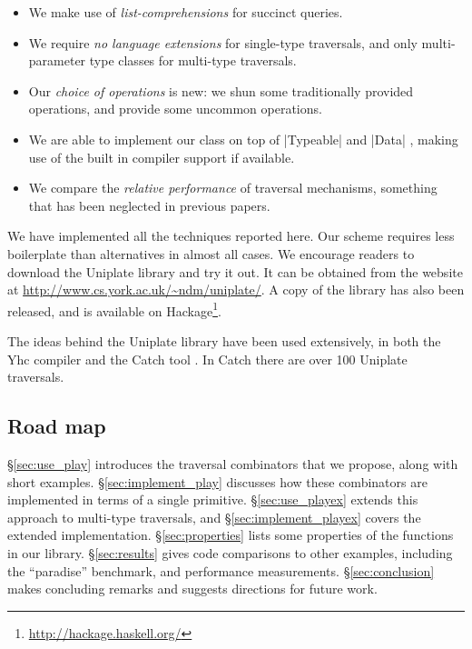 \documentclass[preprint]{sigplanconf}
\begin{document}
\begin{itemize}
\item We make use of \textit{list-comprehensions} \citep{wadler:list_comprehensions} for succinct queries.
\item We require \textit{no language extensions} for single-type traversals, and only multi-parameter type classes \cite{jones:mptc} for multi-type traversals.
\item Our \textit{choice of operations} is new: we shun some traditionally provided operations, and provide some uncommon operations.
\item We are able to implement our class on top of |Typeable| and |Data| \citep{lammel:syb}, making use of the built in compiler support if available.
\item We compare the \textit{relative performance} of traversal mechanisms, something that has been neglected in previous papers.
\end{itemize}

We have implemented all the techniques reported here. Our scheme requires less boilerplate than alternatives in almost all cases. We encourage readers to download the Uniplate library and try it out. It can be obtained from the website at \url{http://www.cs.york.ac.uk/~ndm/uniplate/}. A copy of the library has also been released, and is available on Hackage\footnote{\url{http://hackage.haskell.org/}}.

The ideas behind the Uniplate library have been used extensively, in both the Yhc compiler \cite{yhc} and the Catch tool \cite{me:catch_tfp}. In Catch there are over 100 Uniplate traversals.

\subsection{Road map}

\S\ref{sec:use_play} introduces the traversal combinators that we propose, along with short examples. \S\ref{sec:implement_play} discusses how these combinators are implemented in terms of a single primitive. \S\ref{sec:use_playex} extends this approach to multi-type traversals, and \S\ref{sec:implement_playex} covers the extended implementation. \S\ref{sec:properties} lists some properties of the functions in our library. \S\ref{sec:results} gives code comparisons to other examples, including the ``paradise'' benchmark, and performance measurements. \S\ref{sec:conclusion} makes concluding remarks and suggests directions for future work.
\end{document}
